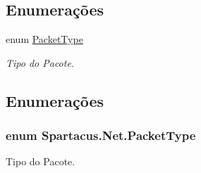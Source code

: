 \subsection*{Enumerações}
\begin{DoxyCompactItemize}
\item 
enum \hyperlink{namespaceSpartacus_1_1Net_a008d71ce1b34dd8b806c7198a8192afe}{Packet\+Type} 
\begin{DoxyCompactList}\small\item\em Tipo do Pacote. \end{DoxyCompactList}\end{DoxyCompactItemize}


\subsection{Enumerações}
\hypertarget{namespaceSpartacus_1_1Net_a008d71ce1b34dd8b806c7198a8192afe}{
\subsubsection[{Packet\+Type}]{\setlength{\rightskip}{0pt plus 5cm}enum {\bf Spartacus.\+Net.\+Packet\+Type}}}\label{namespaceSpartacus_1_1Net_a008d71ce1b34dd8b806c7198a8192afe}


Tipo do Pacote. 

